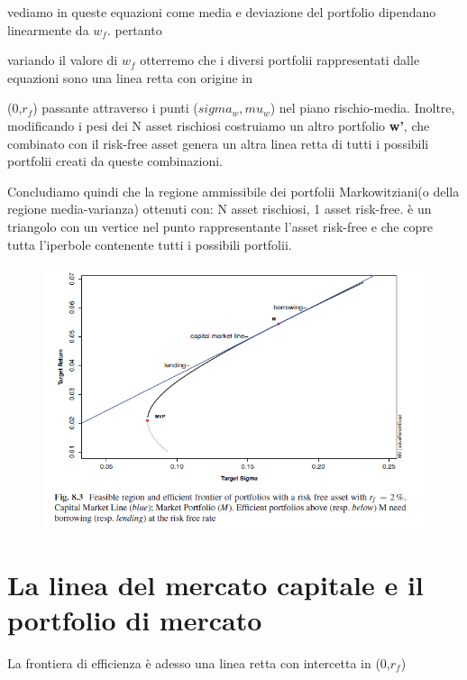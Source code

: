 \documentclass[a4paper,11pt]{report}
\begin{document}
{	vediamo in queste equazioni come media e deviazione del portfolio dipendano linearmente da $w_f$. pertanto

	variando il valore di $w_f$ otterremo che i diversi portfolii rappresentati dalle equazioni sono una linea retta con origine in

	(0,$r_f$) passante attraverso i punti ($sigma_w,mu_w$) nel piano rischio-media. \newline
	Inoltre, modificando i pesi dei N asset rischiosi costruiamo un altro portfolio \textbf{w'},  che combinato con il risk-free asset
	genera un altra linea retta di tutti i possibili portfolii creati da queste combinazioni. \newline

	Concludiamo quindi che la regione ammissibile dei portfolii Markowitziani(o della regione media-varianza) ottenuti con:
	N asset rischiosi,
	1 asset risk-free.
	è un triangolo con un vertice nel punto rappresentante l'asset risk-free e che copre tutta l'iperbole contenente tutti i possibili 		portfolii. 
\begin{figure}[h]
  	\includegraphics[width=\linewidth]{EfficientFrontier_Triangle.png}
	  \label{fig:EfficientTriangle}
\end{figure}
	\newpage

\section{La linea del mercato capitale e il portfolio di mercato}
	La frontiera di efficienza è adesso una linea retta con intercetta in (0,$r_f$) 

}
\end{document}

